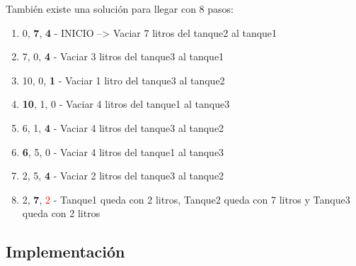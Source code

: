 \documentclass{article}
\begin{document}
También existe una solución para llegar con 8 pasos:
\begin{enumerate}
\item 0, \textbf{7}, \textbf{4} - INICIO --> Vaciar 7 litros del tanque2 al tanque1
\item 7, 0, \textbf{4} - Vaciar 3 litros del tanque3 al tanque1
\item 10, 0, \textbf{1} - Vaciar 1 litro del tanque3 al tanque2
\item \textbf{10}, 1, 0 - Vaciar 4 litros del tanque1 al tanque3
\item 6, 1, \textbf{4} - Vaciar 4 litros del tanque3 al tanque2
\item \textbf{6}, 5, 0 - Vaciar 4 litros del tanque1 al tanque3
\item 2, 5, \textbf{4} - Vaciar 2 litros del tanque3 al tanque2
\item 2, \textbf{7}, \textcolor{red}{2} - Tanque1 queda con 2 litros, Tanque2 queda con 7 litros y Tanque3 queda con 2 litros
\end{enumerate}


\subsection{Implementación}
\end{document}
